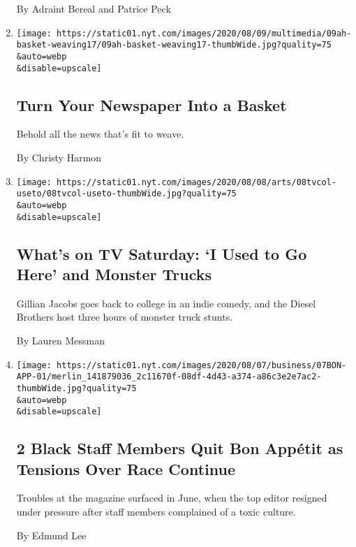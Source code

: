\begin{enumerate}
  By Adraint Bereal and Patrice Peck
\item
  \href{/2020/08/08/at-home/coronavirus-newspaper-basket.html}{}

  \texttt{[image: https://static01.nyt.com/images/2020/08/09/multimedia/09ah-basket-weaving17/09ah-basket-weaving17-thumbWide.jpg?quality=75\\\&auto=webp\\\&disable=upscale]}

  \hypertarget{turn-your-newspaper-into-a-basket}{%
  \subsection{Turn Your Newspaper Into a
  Basket}\label{turn-your-newspaper-into-a-basket}}

  Behold all the news that's fit to weave.

  By Christy Harmon
\item
  \href{/2020/08/08/arts/television/whats-on-tv-saturday-i-used-to-go-here-and-monster-trucks.html}{}

  \texttt{[image: https://static01.nyt.com/images/2020/08/08/arts/08tvcol-useto/08tvcol-useto-thumbWide.jpg?quality=75\\\&auto=webp\\\&disable=upscale]}

  \hypertarget{whats-on-tv-saturday-i-used-to-go-here-and-monster-trucks}{%
  \subsection{What's on TV Saturday: `I Used to Go Here' and Monster
  Trucks}\label{whats-on-tv-saturday-i-used-to-go-here-and-monster-trucks}}

  Gillian Jacobs goes back to college in an indie comedy, and the Diesel
  Brothers host three hours of monster truck stunts.

  By Lauren Messman
\item
  \href{/2020/08/07/business/media/bon-appetit-race-black-staff-quits.html}{}

  \texttt{[image: https://static01.nyt.com/images/2020/08/07/business/07BON-APP-01/merlin\_141879036\_2c11670f-08df-4d43-a374-a86c3e2e7ac2-thumbWide.jpg?quality=75\\\&auto=webp\\\&disable=upscale]}

  \hypertarget{2-black-staff-members-quit-bon-appuxe9tit-as-tensions-over-race-continue}{%
  \subsection{2 Black Staff Members Quit Bon Appétit as Tensions Over
  Race
  Continue}\label{2-black-staff-members-quit-bon-appuxe9tit-as-tensions-over-race-continue}}

  Troubles at the magazine surfaced in June, when the top editor
  resigned under pressure after staff members complained of a toxic
  culture.

  By Edmund Lee
\end{enumerate}

